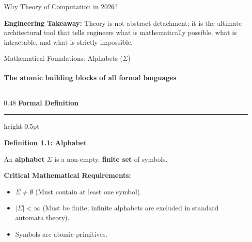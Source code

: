 \documentclass[aspectratio=169, 10pt]{beamer}
\newcommand{\colheader}[1]{%
  {\noindent\footnotesize\bfseries\color{gimpanavy}#1}%
  \vspace{0.02cm}%
  {\color{gimpanavy!30}\hrule height 0.5pt}%
  \vspace{0.05cm}%
}
\newcommand{\cardtitle}[1]{{\noindent\footnotesize\bfseries\color{gimpanavy}#1}\par\vspace{0.03cm}}
\begin{document}
\begin{frame}{Why Theory of Computation in 2026?}
  \vspace{0.10cm}
  \begin{tcolorbox}[alertcard]
    {\scriptsize\textbf{Engineering Takeaway:} Theory is not abstract detachment; it is the ultimate architectural tool that tells engineers what is mathematically possible, what is intractable, and what is strictly impossible.}
  \end{tcolorbox}
\end{frame}

\begin{frame}{Mathematical Foundations: Alphabets ($\Sigma$)}
  \framesubtitle{The atomic building blocks of all formal languages}
  
  \begin{columns}[T]
    \begin{column}{0.48\textwidth}
      \colheader{Formal Definition}
      \begin{tcolorbox}[conceptcard]
        \cardtitle{Definition 1.1: Alphabet}
        {\scriptsize
        An \textbf{alphabet} $\Sigma$ is a non-empty, \textbf{finite set} of symbols.
        }
        \vspace{0.06cm}
        
        \cardtitle{Critical Mathematical Requirements:}
        \begin{itemize}\setlength{\itemsep}{2pt}\scriptsize
          \item $\Sigma \ne \emptyset$ (Must contain at least one symbol).
          \item $|\Sigma| < \infty$ (Must be finite; infinite alphabets are excluded in standard automata theory).
          \item Symbols are atomic primitives.
        \end{itemize}
      \end{tcolorbox}
    \end{column}
    

\end{columns}
\end{frame}
\end{document}
